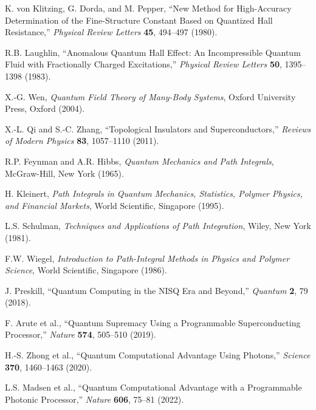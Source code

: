\documentclass[11pt]{article}
\theoremstyle{plain}
\theoremstyle{definition}
\theoremstyle{remark}
\begin{document}
\begin{thebibliography}{99}
 K. von Klitzing, G. Dorda, and M. Pepper, ``New Method for High-Accuracy Determination of the Fine-Structure Constant Based on Quantized Hall Resistance,'' \emph{Physical Review Letters} \textbf{45}, 494--497 (1980).

 R.B. Laughlin, ``Anomalous Quantum Hall Effect: An Incompressible Quantum Fluid with Fractionally Charged Excitations,'' \emph{Physical Review Letters} \textbf{50}, 1395--1398 (1983).

 X.-G. Wen, \emph{Quantum Field Theory of Many-Body Systems}, Oxford University Press, Oxford (2004).

 X.-L. Qi and S.-C. Zhang, ``Topological Insulators and Superconductors,'' \emph{Reviews of Modern Physics} \textbf{83}, 1057--1110 (2011).

 R.P. Feynman and A.R. Hibbs, \emph{Quantum Mechanics and Path Integrals}, McGraw-Hill, New York (1965).

 H. Kleinert, \emph{Path Integrals in Quantum Mechanics, Statistics, Polymer Physics, and Financial Markets}, World Scientific, Singapore (1995).

 L.S. Schulman, \emph{Techniques and Applications of Path Integration}, Wiley, New York (1981).

 F.W. Wiegel, \emph{Introduction to Path-Integral Methods in Physics and Polymer Science}, World Scientific, Singapore (1986).

 J. Preskill, ``Quantum Computing in the NISQ Era and Beyond,'' \emph{Quantum} \textbf{2}, 79 (2018).

 F. Arute et al., ``Quantum Supremacy Using a Programmable Superconducting Processor,'' \emph{Nature} \textbf{574}, 505--510 (2019).

 H.-S. Zhong et al., ``Quantum Computational Advantage Using Photons,'' \emph{Science} \textbf{370}, 1460--1463 (2020).

 L.S. Madsen et al., ``Quantum Computational Advantage with a Programmable Photonic Processor,'' \emph{Nature} \textbf{606}, 75--81 (2022).

\end{thebibliography}
\end{document}
